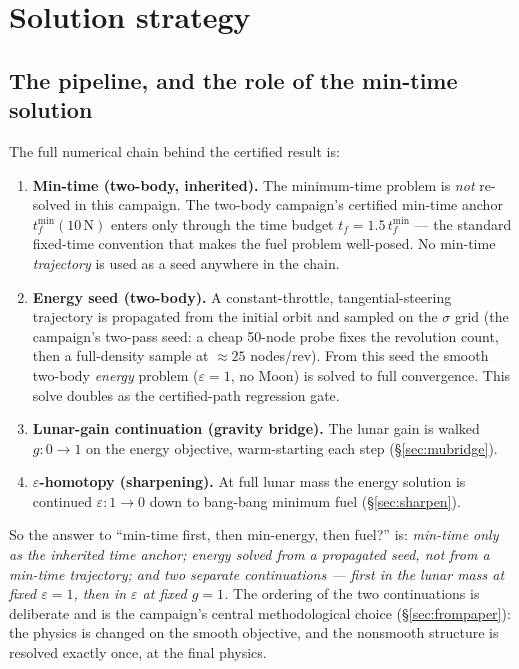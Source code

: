 \documentclass[11pt]{article}
\begin{document}
\section{Solution strategy}
\label{sec:continuation}

\subsection{The pipeline, and the role of the min-time solution}

The full numerical chain behind the certified result is:
\begin{enumerate}
\item \textbf{Min-time (two-body, inherited).} The minimum-time problem is
  \emph{not} re-solved in this campaign. The two-body campaign's certified
  min-time anchor $t_f^{\min}(10\,\mathrm{N})$ enters only through the
  time budget $t_f = 1.5\,t_f^{\min}$ --- the standard fixed-time
  convention that makes the fuel problem well-posed. No min-time
  \emph{trajectory} is used as a seed anywhere in the chain.
\item \textbf{Energy seed (two-body).} A constant-throttle,
  tangential-steering trajectory is propagated from the initial orbit and
  sampled on the $\sigma$ grid (the campaign's two-pass seed: a cheap
  50-node probe fixes the revolution count, then a full-density sample at
  $\approx 25$ nodes/rev). From this seed the smooth two-body
  \emph{energy} problem ($\varepsilon = 1$, no Moon) is solved to full
  convergence. This solve doubles as the certified-path regression gate.
\item \textbf{Lunar-gain continuation (gravity bridge).} The lunar gain is
  walked $g: 0 \to 1$ on the energy objective, warm-starting each step
  (\S\ref{sec:mubridge}).
\item \textbf{$\varepsilon$-homotopy (sharpening).} At full lunar mass the
  energy solution is continued $\varepsilon: 1 \to 0$ down to bang-bang
  minimum fuel (\S\ref{sec:sharpen}).
\end{enumerate}
So the answer to ``min-time first, then min-energy, then fuel?'' is:
\emph{min-time only as the inherited time anchor; energy solved from a
propagated seed, not from a min-time trajectory; and two separate
continuations --- first in the lunar mass at fixed $\varepsilon = 1$, then
in $\varepsilon$ at fixed $g = 1$.} The ordering of the two continuations
is deliberate and is the campaign's central methodological choice
(\S\ref{sec:frompaper}): the physics is changed on the smooth objective,
and the nonsmooth structure is resolved exactly once, at the final physics.
\end{document}

